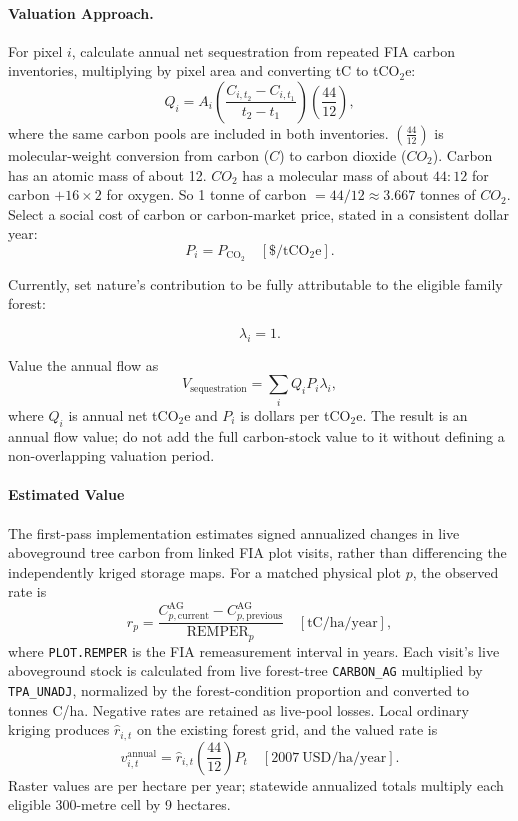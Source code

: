 \documentclass[11pt]{article}
\begin{document}
\paragraph{Valuation Approach.}
For pixel $i$, calculate annual net sequestration from repeated FIA carbon inventories, multiplying by pixel area and converting tC to tCO$_2$e:
\[
Q_i=A_i\left(\frac{C_{i,t_2}-C_{i,t_1}}{t_2-t_1}\right)\left(\frac{44}{12}\right),
\]
where the same carbon pools are included in both inventories. $\left(\frac{44}{12}\right)$ is molecular-weight conversion from carbon ($C$) to carbon dioxide ($CO_2$). 
Carbon has an atomic mass of about 12. 
$CO_2$ has a molecular mass of about $44:12$ for carbon $+ 16 \times 2$ for oxygen.
So 1 tonne of carbon $= 44/12 \approx 3.667$ tonnes of $CO_2$.
Select a social cost of carbon or carbon-market price, stated in a consistent dollar year:
\[
P_i=P_{\mathrm{CO_2}}\quad [\$/\mathrm{tCO_2e}].
\]

Currently, set nature's contribution to be fully attributable to the eligible family forest:

\[
\lambda_i= 1.
\]

Value the annual flow as
\[
V_{\mathrm{sequestration}}=\sum_i Q_iP_i\lambda_i,
\]
where $Q_i$ is annual net tCO$_2$e and $P_i$ is dollars per tCO$_2$e. The result is an annual flow value; do not add the full carbon-stock value to it without defining a non-overlapping valuation period.

\paragraph{Estimated Value}

The first-pass implementation estimates signed annualized changes in live aboveground tree carbon from linked FIA plot visits, rather than differencing the independently kriged storage maps. For a matched physical plot $p$, the observed rate is
\begin{equation}
r_p=\frac{C^{\mathrm{AG}}_{p,\mathrm{current}}-
                C^{\mathrm{AG}}_{p,\mathrm{previous}}}
               {\mathrm{REMPER}_p}
\quad [\mathrm{tC/ha/year}],
\label{eq:matched-carbon-rate}
\end{equation}
where \texttt{PLOT.REMPER} is the FIA remeasurement interval in years. Each visit's live aboveground stock is calculated from live forest-tree \texttt{CARBON\_AG} multiplied by \texttt{TPA\_UNADJ}, normalized by the forest-condition proportion and converted to tonnes C/ha. Negative rates are retained as live-pool losses. Local ordinary kriging produces $\widehat r_{i,t}$ on the existing forest grid, and the valued rate is
\begin{equation}
v^{\mathrm{annual}}_{i,t}
=\widehat r_{i,t}\left(\frac{44}{12}\right)P_t
\quad [\mathrm{2007\ USD/ha/year}].
\label{eq:implemented-carbon-sequestration}
\end{equation}
Raster values are per hectare per year; statewide annualized totals multiply each eligible 300-metre cell by 9 hectares. 
\end{document}
